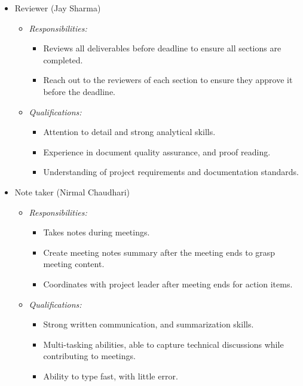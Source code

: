 \documentclass{article}
\begin{document}
\begin{itemize}
\begin{itemize}
\begin{itemize}
        \end{itemize}
    \end{itemize}
  \item Reviewer (Jay Sharma)
    \begin{itemize}
      \item \textit{Responsibilities:}
        \begin{itemize}
          \item Reviews all deliverables before deadline to ensure all sections
           are completed.
          \item Reach out to the reviewers of each section to ensure they
          approve it before the deadline.
        \end{itemize}
      \item \textit{Qualifications:}
        \begin{itemize}
          \item Attention to detail and strong analytical skills.
          \item Experience in document quality assurance, and proof reading. 
          \item Understanding of project requirements and documentation
          standards. 
        \end{itemize}
    \end{itemize}
  \item Note taker (Nirmal Chaudhari)
    \begin{itemize}
      \item \textit{Responsibilities:}
        \begin{itemize}
          \item Takes notes during meetings.
          \item Create meeting notes summary after the meeting ends to grasp
          meeting content.
          \item Coordinates with project leader after meeting ends for action
          items. 
        \end{itemize}
      \item \textit{Qualifications:}
        \begin{itemize}
          \item Strong written communication, and summarization skills. 
          \item Multi-tasking abilities, able to capture technical discussions
          while contributing to meetings. 
          \item Ability to type fast, with little error. 
        \end{itemize}

\end{itemize}
\end{itemize}
\end{document}
